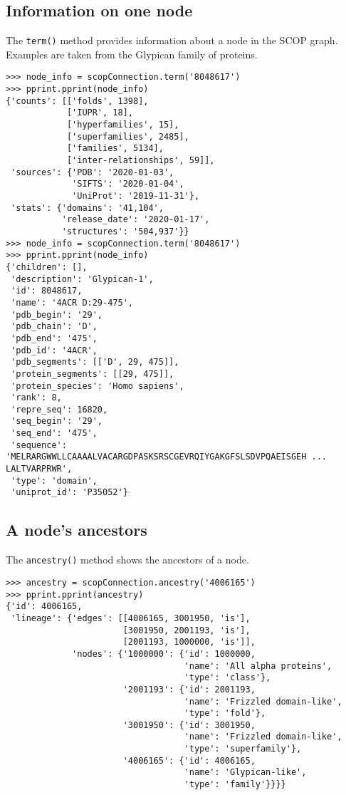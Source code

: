 \subsection{Information on one node}

The \verb|term()| method provides information about a node in the SCOP graph. Examples are taken from the Glypican family of proteins.

\begin{verbatim}
>>> node_info = scopConnection.term('8048617')
>>> pprint.pprint(node_info)
{'counts': [['folds', 1398],
            ['IUPR', 18],
            ['hyperfamilies', 15],
            ['superfamilies', 2485],
            ['families', 5134],
            ['inter-relationships', 59]],
 'sources': {'PDB': '2020-01-03',
             'SIFTS': '2020-01-04',
             'UniProt': '2019-11-31'},
 'stats': {'domains': '41,104',
           'release_date': '2020-01-17',
           'structures': '504,937'}}
>>> node_info = scopConnection.term('8048617')
>>> pprint.pprint(node_info)
{'children': [],
 'description': 'Glypican-1',
 'id': 8048617,
 'name': '4ACR D:29-475',
 'pdb_begin': '29',
 'pdb_chain': 'D',
 'pdb_end': '475',
 'pdb_id': '4ACR',
 'pdb_segments': [['D', 29, 475]],
 'protein_segments': [[29, 475]],
 'protein_species': 'Homo sapiens',
 'rank': 8,
 'repre_seq': 16820,
 'seq_begin': '29',
 'seq_end': '475',
 'sequence': 'MELRARGWWLLCAAAALVACARGDPASKSRSCGEVRQIYGAKGFSLSDVPQAEISGEH ... LALTVARPRWR',
 'type': 'domain',
 'uniprot_id': 'P35052'}
\end{verbatim}

\subsection{A node's ancestors}

The \verb|ancestry()| method shows the ancestors of a node.

\begin{verbatim}
>>> ancestry = scopConnection.ancestry('4006165')
>>> pprint.pprint(ancestry)
{'id': 4006165,
 'lineage': {'edges': [[4006165, 3001950, 'is'],
                       [3001950, 2001193, 'is'],
                       [2001193, 1000000, 'is']],
             'nodes': {'1000000': {'id': 1000000,
                                   'name': 'All alpha proteins',
                                   'type': 'class'},
                       '2001193': {'id': 2001193,
                                   'name': 'Frizzled domain-like',
                                   'type': 'fold'},
                       '3001950': {'id': 3001950,
                                   'name': 'Frizzled domain-like',
                                   'type': 'superfamily'},
                       '4006165': {'id': 4006165,
                                   'name': 'Glypican-like',
                                   'type': 'family'}}}}
\end{verbatim}

